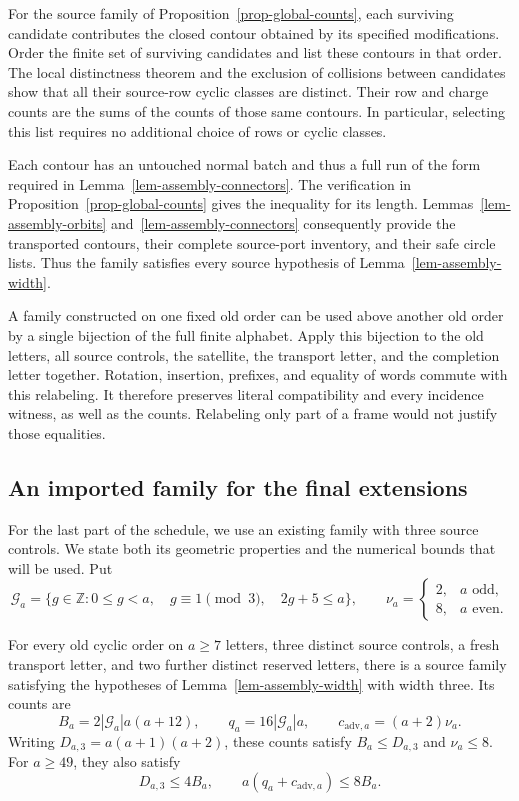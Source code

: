 For the source family of Proposition~\ref{prop-global-counts}, each
surviving candidate contributes the closed contour obtained by its
specified modifications. Order the finite set of surviving candidates
and list these contours in that order. The local distinctness theorem
and the exclusion of collisions between candidates show that all their
source-row cyclic classes are distinct. Their row and charge counts are
the sums of the counts of those same contours. In particular, selecting
this list requires no additional choice of rows or cyclic classes.

Each contour has an untouched normal batch and thus a full run of the
form required in Lemma~\ref{lem-assembly-connectors}. The verification
in Proposition~\ref{prop-global-counts} gives the inequality for its
length. Lemmas~\ref{lem-assembly-orbits}
and~\ref{lem-assembly-connectors} consequently provide the transported
contours, their complete source-port inventory, and their safe circle
lists. Thus the family satisfies every source hypothesis of
Lemma~\ref{lem-assembly-width}.

A family constructed on one fixed old order can be used above another
old order by a single bijection of the full finite alphabet. Apply this
bijection to the old letters, all source controls, the satellite, the
transport letter, and the completion letter together. Rotation,
insertion, prefixes, and equality of words commute with this relabeling.
It therefore preserves literal compatibility and every incidence
witness, as well as the counts. Relabeling only part of a frame would
not justify those equalities.

\subsection{An imported family for the final extensions}

For the last part of the schedule, we use an existing family with three
source controls. We state both its geometric properties and the numerical
bounds that will be used. Put
\[
 \mathcal G_a=\{g\in\mathbb Z:0\le g<a,\quad
   g\equiv1\pmod3,\quad 2g+5\le a\},
 \qquad
 \nu_a=
 \begin{cases}2,&a\text{ odd},\\8,&a\text{ even}.\end{cases}
\]

\begin{proposition}\label{prop-assembly-dense}
For every old cyclic order on $a\ge7$ letters, three distinct source
controls, a fresh transport letter, and two further distinct reserved
letters, there is a source family satisfying the hypotheses of
Lemma~\ref{lem-assembly-width} with width three. Its counts are
\[
 B_a=2|\mathcal G_a|a(a+12),\qquad
 q_a=16|\mathcal G_a|a,\qquad
 c_{\mathrm{adv},a}=(a+2)\nu_a.
\]
Writing $D_{a,3}=a(a+1)(a+2)$, these counts satisfy
$B_a\le D_{a,3}$ and $\nu_a\le8$. For $a\ge49$, they also satisfy
\[
 D_{a,3}\le4B_a,\qquad
 a(q_a+c_{\mathrm{adv},a})\le8B_a.
\]
\end{proposition}

